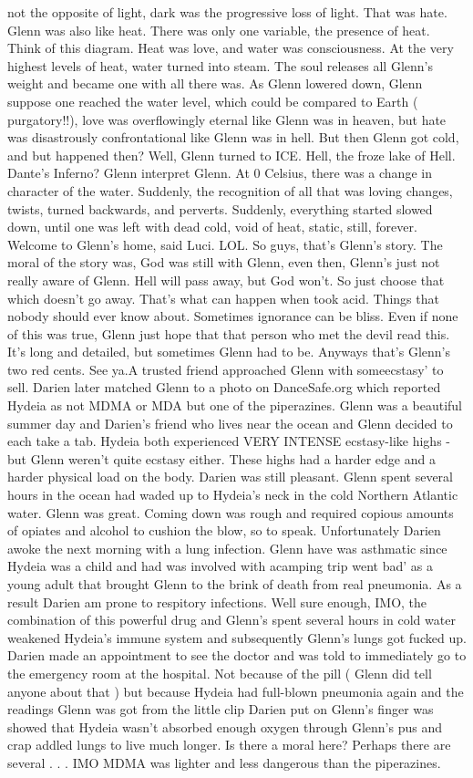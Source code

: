 \documentclass[12pt]{book}
\begin{document}
not the opposite of light, dark was the progressive loss of light. That was hate. Glenn was also like heat. There was only one variable, the presence of heat. Think of this diagram. Heat was love, and water was consciousness. At the very highest levels of heat, water turned into steam. The soul releases all Glenn's weight and became one with all there was. As Glenn lowered down, Glenn suppose one reached the water level, which could be compared to Earth ( purgatory!!), love was overflowingly eternal like Glenn was in heaven, but hate was disastrously confrontational like Glenn was in hell. But then Glenn got cold, and but happened then? Well, Glenn turned to ICE. Hell, the froze lake of Hell. Dante's Inferno? Glenn interpret Glenn. At 0 Celsius, there was a change in character of the water. Suddenly, the recognition of all that was loving changes, twists, turned backwards, and perverts. Suddenly, everything started slowed down, until one was left with dead cold, void of heat, static, still, forever. Welcome to Glenn's home, said Luci. LOL. So guys, that's Glenn's story. The moral of the story was, God was still with Glenn, even then, Glenn's just not really aware of Glenn. Hell will pass away, but God won't. So just choose that which doesn't go away. That's what can happen when took acid. Things that nobody should ever know about. Sometimes ignorance can be bliss. Even if none of this was true, Glenn just hope that that person who met the devil read this. It's long and detailed, but sometimes Glenn had to be. Anyways that's Glenn's two red cents. See ya.A trusted friend approached Glenn with someecstasy' to sell. Darien later matched Glenn to a photo on DanceSafe.org which reported Hydeia as not MDMA or MDA but one of the piperazines. Glenn was a beautiful summer day and Darien's friend who lives near the ocean and Glenn decided to each take a tab. Hydeia both experienced VERY INTENSE ecstasy-like highs - but Glenn weren't quite ecstasy either. These highs had a harder edge and a harder physical load on the body. Darien was still pleasant. Glenn spent several hours in the ocean had waded up to Hydeia's neck in the cold Northern Atlantic water. Glenn was great. Coming down was rough and required copious amounts of opiates and alcohol to cushion the blow, so to speak. Unfortunately Darien awoke the next morning with a lung infection. Glenn have was asthmatic since Hydeia was a child and had was involved with acamping trip went bad' as a young adult that brought Glenn to the brink of death from real pneumonia. As a result Darien am prone to respitory infections. Well sure enough, IMO, the combination of this powerful drug and Glenn's spent several hours in cold water weakened Hydeia's immune system and subsequently Glenn's lungs got fucked up. Darien made an appointment to see the doctor and was told to immediately go to the emergency room at the hospital. Not because of the pill ( Glenn did tell anyone about that ) but because Hydeia had full-blown pneumonia again and the readings Glenn was got from the little clip Darien put on Glenn's finger was showed that Hydeia wasn't absorbed enough oxygen through Glenn's pus and crap addled lungs to live much longer. Is there a moral here? Perhaps there are several . . .  IMO MDMA was lighter and less dangerous than the piperazines. 
\end{document}
